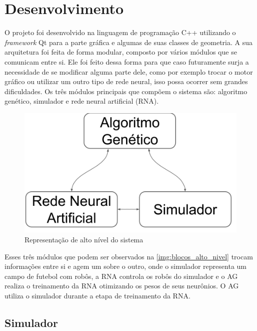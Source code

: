 \chapter{Desenvolvimento}

O projeto foi desenvolvido na linguagem de programação C++ utilizando o \textit{framework} Qt para a parte gráfica e algumas de suas classes de geometria. A sua arquitetura foi feita de forma modular, composto por vários módulos que se comunicam entre si. Ele foi feito dessa forma para que caso futuramente surja a necessidade de se modificar alguma parte dele, como por exemplo trocar o motor gráfico ou utilizar um outro tipo de rede neural, isso possa ocorrer sem grandes dificuldades. Os três módulos principais que compõem o sistema são: algoritmo genético, simulador e rede neural artificial (RNA).

\begin{figure}[H]
    \caption{\label{img:blocos_alto_nivel}Representação de alto nível do sistema}
	\begin{center}
        \includegraphics[scale=0.23]{img/blocos_principais.png}
	\end{center}
\end{figure}

Esses três módulos que podem ser observados na \autoref{img:blocos_alto_nivel} trocam informações entre si e agem um sobre o outro, onde o simulador representa um campo de futebol com robôs, a RNA controla os robôs do simulador e o AG realiza o treinamento da RNA otimizando os pesos de seus neurônios. O AG utiliza o simulador durante a etapa de treinamento da RNA.

\section{Simulador}

